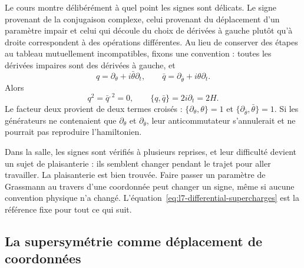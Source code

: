 Le cours montre délibérément à quel point les signes sont délicats. Le signe provenant de la conjugaison complexe, celui provenant du déplacement d’un paramètre impair et celui qui découle du choix de dérivées à gauche plutôt qu’à droite correspondent à des opérations différentes. Au lieu de conserver des étapes au tableau mutuellement incompatibles, fixons une convention : toutes les dérivées impaires sont des dérivées à gauche, et
\begin{equation}
q=\partial_\theta+i\bar\theta\partial_t,
\qquad
\bar q=\partial_{\bar\theta}+i\theta\partial_t.
\label{eq:l7-differential-supercharges}
\end{equation}
Alors
\begin{equation}
q^2=\bar q^{,2}=0,
\qquad
\{q,\bar q\}=2i\partial_t=2H.
\label{eq:l7-differential-algebra}
\end{equation}
Le facteur deux provient de deux termes croisés : \(\{\partial_\theta,\theta\}=1\) et \(\{\partial_{\bar\theta},\bar\theta\}=1\). Si les générateurs ne contenaient que \(\partial_\theta\) et \(\partial_{\bar\theta}\), leur anticommutateur s’annulerait et ne pourrait pas reproduire l’hamiltonien.

\begin{classroomqa}
\end{classroomqa}

Dans la salle, les signes sont vérifiés à plusieurs reprises, et leur difficulté devient un sujet de plaisanterie : ils semblent changer pendant le trajet pour aller travailler. La plaisanterie est bien trouvée. Faire passer un paramètre de Grassmann au travers d’une coordonnée peut changer un signe, même si aucune convention physique n’a changé. L’équation~\eqref{eq:l7-differential-supercharges} est la référence fixe pour tout ce qui suit.

\subsection{La supersymétrie comme déplacement de coordonnées}

